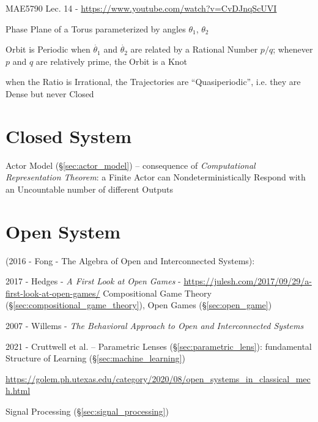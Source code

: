 MAE5790 Lec. 14 - \url{https://www.youtube.com/watch?v=CvDJnqScUVI}

Phase Plane of a Torus parameterized by angles $\theta_1$, $\theta_2$

Orbit is Periodic when $\dot{\theta_1}$ and $\dot{\theta_2}$ are related by a
Rational Number $p/q$; whenever $p$ and $q$ are relatively prime, the Orbit is a
Knot

when the Ratio is Irrational, the Trajectories are ``Quasiperiodic'', i.e. they
are Dense but never Closed



\section{Closed System}\label{sec:closed_system}


Actor Model (\S\ref{sec:actor_model}) -- consequence of \emph{Computational
  Representation Theorem}: a Finite Actor can Nondeterministically Respond with
an Uncountable number of different Outputs %



\section{Open System}\label{sec:open_system}

(2016 - Fong - The Algebra of Open and Interconnected Systems):

2017 - Hedges - \emph{A First Look at Open Games} -
\url{https://julesh.com/2017/09/29/a-first-look-at-open-games/} \fist
Compositional Game Theory (\S\ref{sec:compositional_game_theory}), Open Games
(\S\ref{sec:open_game})

2007 - Willems - \emph{The Behavioral Approach to Open and Interconnected
  Systems}

2021 - Cruttwell et al. -- Parametric Lenses (\S\ref{sec:parametric_lens}):
fundamental Structure of Learning (\S\ref{sec:machine_learning})

\url{https://golem.ph.utexas.edu/category/2020/08/open_systems_in_classical_mech.html}

\fist Signal Processing (\S\ref{sec:signal_processing})

